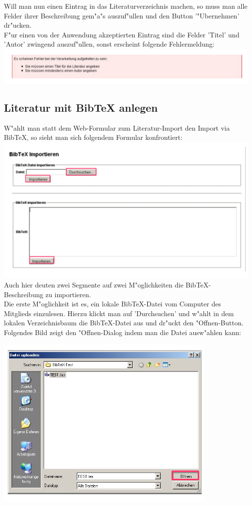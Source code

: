 Will man nun einen Eintrag in das Literaturverzeichnis machen, so muss man alle Felder ihrer Beschreibung gem"a"s auszuf"ullen und den Button '"Ubernehmen' dr"ucken.\\
F"ur einen von der Anwendung akzeptierten Eintrag sind die Felder 'Titel' und 'Autor' zwingend auszuf"ullen, sonst erscheint folgende Fehlermeldung:\\
\includegraphics[scale=0.8]{err}\\

\subsection{Literatur mit BibTeX anlegen}
W"ahlt man statt dem Web-Formular zum Literatur-Import den Import via BibTeX, so sieht man sich folgendem Formular konfrontiert:\\
\includegraphics[scale=0.8]{bibtex}\\
Auch hier deuten zwei Segmente auf zwei M"oglichkeiten die BibTeX-Beschreibung zu importieren.\\
Die erste M"oglichkeit ist es, ein lokale BibTeX-Datei vom Computer des Mitglieds einzulesen. Hierzu klickt man auf 'Durchsuchen' und w"ahlt in dem lokalen Verzeichnisbaum die BibTeX-Datei aus und dr"uckt den "Offnen-Button. Folgendes Bild zeigt den "Offnen-Dialog indem man die Datei ausw"ahlen kann:\\
\begin{center}
\includegraphics[scale=0.8]{import1}\\
\end{center}
